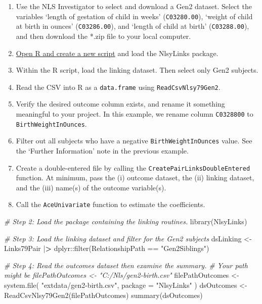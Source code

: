 \documentclass[smallextended]{svjour3}       %
\providecommand{\tightlist}{%
  \setlength{\itemsep}{0pt}\setlength{\parskip}{0pt}}
\newenvironment{Shaded}{\begin{snugshade}}{\end{snugshade}}
\newcommand{\AttributeTok}[1]{\textcolor[rgb]{0.77,0.63,0.00}{#1}}
\newcommand{\CommentTok}[1]{\textcolor[rgb]{0.56,0.35,0.01}{\textit{#1}}}
\newcommand{\ErrorTok}[1]{\textcolor[rgb]{0.64,0.00,0.00}{\textbf{#1}}}
\newcommand{\FunctionTok}[1]{\textcolor[rgb]{0.00,0.00,0.00}{#1}}
\newcommand{\NormalTok}[1]{#1}
\newcommand{\OtherTok}[1]{\textcolor[rgb]{0.56,0.35,0.01}{#1}}
\newcommand{\SpecialCharTok}[1]{\textcolor[rgb]{0.00,0.00,0.00}{#1}}
\newcommand{\StringTok}[1]{\textcolor[rgb]{0.31,0.60,0.02}{#1}}
\begin{document}
\begin{enumerate}
\def\labelenumi{\arabic{enumi}.}
\tightlist
\item
  Use the NLS Investigator to select and download a Gen2 dataset. Select
  the variables `length of gestation of child in weeks'
  (\texttt{C03280.00}), `weight of child at birth in ounces'
  (\texttt{C03286.00}), and `length of child at birth'
  (\texttt{C03288.00}), and then download the *.zip file to your local
  computer.
\item
  \protect\hyperlink{appendix-creating-and-saving-r-scripts}{Open R and
  create a new script} and load the NlsyLinks package.
\item
  Within the R script, load the linking dataset. Then select only Gen2
  subjects.
\item
  Read the CSV into R as a \texttt{data.frame} using
  \texttt{ReadCsvNlsy79Gen2}.
\item
  Verify the desired outcome column exists, and rename it something
  meaningful to your project. In this example, we rename column
  \texttt{C0328800} to \texttt{BirthWeightInOunces}.
\item
  Filter out all subjects who have a negative
  \texttt{BirthWeightInOunces} value. See the `Further Information' note
  in the previous example.
\item
  Create a double-entered file by calling the
  \texttt{CreatePairLinksDoubleEntered} function. At minimum, pass the
  (i) outcome dataset, the (ii) linking dataset, and the (iii) name(s)
  of the outcome variable(s).
\item
  Call the \texttt{AceUnivariate} function to estimate the coefficients.
\end{enumerate}

\begin{Shaded}
\begin{Highlighting}[]
\CommentTok{\# Step 2: Load the package containing the linking routines.}
\FunctionTok{library}\NormalTok{(NlsyLinks)}

\CommentTok{\# Step 3: Load the linking dataset and filter for the Gen2 subjects}
\NormalTok{dsLinking }\OtherTok{\textless{}{-}} 
\NormalTok{  Links79Pair }\SpecialCharTok{|}\ErrorTok{\textgreater{}} 
\NormalTok{  dplyr}\SpecialCharTok{::}\FunctionTok{filter}\NormalTok{(RelationshipPath }\SpecialCharTok{==} \StringTok{"Gen2Siblings"}\NormalTok{)}

\CommentTok{\# Step 4: Read the outcomes dataset then examine the summary.}
\CommentTok{\#   Your path might be \textasciigrave{}filePathOutcomes \textless{}{-} "C:/Nls/gen2{-}birth.csv"\textasciigrave{}}
\NormalTok{filePathOutcomes }\OtherTok{\textless{}{-}} 
  \FunctionTok{system.file}\NormalTok{(}
    \StringTok{"extdata/gen2{-}birth.csv"}\NormalTok{, }
    \AttributeTok{package =} \StringTok{"NlsyLinks"}
\NormalTok{  )}
\NormalTok{dsOutcomes }\OtherTok{\textless{}{-}} \FunctionTok{ReadCsvNlsy79Gen2}\NormalTok{(filePathOutcomes)}
\FunctionTok{summary}\NormalTok{(dsOutcomes)}
\end{Highlighting}
\end{Shaded}
\end{document}
